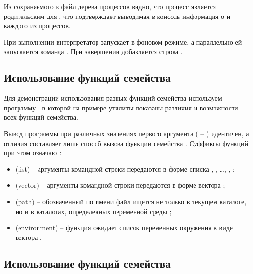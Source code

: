 





Из сохраняемого в файл  дерева процессов видно, что процесс  является родительским для , что подтверждает выводимая в консоль информация о  и  каждого из процессов.



При выполнении  интерпретатор запускает  в фоновом режиме, а параллельно ей запускается команда . При завершении  добавляется строка .



\subsection{Использование функций семейства }

Для демонстрации использования разных функций семейства используем программу , в которой на примере утилиты  показаны различия и возможности всех функций семейства.



Вывод программы при различных значениях первого аргумента ( -- ) идентичен, а отличия составляет лишь способ вызова функции семейства . Суффиксы функций при этом означают:
\begin{itemize}
	\item {} (list) -- аргументы командной строки передаются в форме списка , , \dots, , ;
	\item {} (vector) -- аргументы командной строки передаются в форме вектора ;
	\item {} (path) -- обозначенный по имени файл ищется не только в текущем каталоге, но и в каталогах, определенных переменной среды ;
	\item {} (environment) -- функция ожидает список переменных окружения в виде вектора .
\end{itemize}

\subsection{Использование функций семейства }

